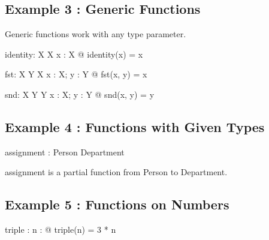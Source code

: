 \documentclass[a4paper,10pt,fleqn]{article}
\begin{document}
\subsection*{Example 3 : Generic Functions}

\noindent Generic functions work with any type parameter.

\bigskip

\begin{gendef}[X]
  identity: X \fun X
\where
  \forall x : X @ identity(x) = x
\end{gendef}

\begin{gendef}[X, Y]
  fst: X \cross Y \fun X
\where
  \forall x : X; y : Y @ fst(x, y) = x
\end{gendef}

\begin{gendef}[X, Y]
  snd: X \cross Y \fun Y
\where
  \forall x : X; y : Y @ snd(x, y) = y
\end{gendef}

\subsection*{Example 4 : Functions with Given Types}

\begin{zed}
\end{zed}

\begin{axdef}
assignment : Person \pfun Department
\end{axdef}

\noindent assignment is a partial function from Person to Department.

\bigskip

\subsection*{Example 5 : Functions on Numbers}

\begin{axdef}
triple : \nat \fun \nat
\where
\forall n : \nat @ triple(n) = 3 * n
\end{axdef}

\end{document}
